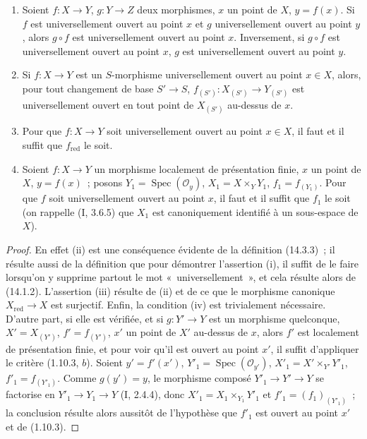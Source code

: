 \begin{proposition}[14.3.4]
\label{IV.14.3.4-fr}
\begin{enumerate}[label=(\roman*)]
  \item Soient $f:X\to Y$, $g:Y\to Z$ deux morphismes, $x$ un point de $X$,
  $y=f(x)$. Si $f$ est universellement ouvert au point $x$ et $g$ universellement
  ouvert au point $y$, alors $g\circ f$ est universellement ouvert au point $x$.
  Inversement, si $g\circ f$ est universellement ouvert au point $x$, $g$ est
  universellement ouvert au point $y$.

  \item Si $f:X\to Y$ est un $S$-morphisme universellement ouvert au point
  $x\in X$, alors, pour tout changement de base $S'\to S$,
  $f_{(S')}:X_{(S')}\to Y_{(S')}$ est universellement ouvert en tout point de
  $X_{(S')}$ au-dessus de $x$.

  \item Pour que $f:X\to Y$ soit universellement ouvert au point $x\in X$, il
  faut et il suffit que $f_{\mathrm{red}}$ le soit.

  \item Soient $f:X\to Y$ un morphisme localement de présentation finie, $x$ un
  point de $X$, $y=f(x)$~; posons $Y_1=\operatorname{Spec}(\mathcal O_y)$,
  $X_1=X\times_Y Y_1$, $f_1=f_{(Y_1)}$. Pour que $f$ soit universellement ouvert
  au point $x$, il faut et il suffit que $f_1$ le soit (on rappelle (I, 3.6.5) que
  $X_1$ est canoniquement identifié à un sous-espace de $X$).
\end{enumerate}
\end{proposition}

\begin{proof}
En effet (ii) est une conséquence évidente de la définition (14.3.3)~; il résulte
aussi de la définition que pour démontrer l'assertion (i), il suffit de le faire
lorsqu'on y supprime partout le mot «~universellement~», et cela résulte alors de
(14.1.2). L'assertion (iii) résulte de (ii) et de ce que le morphisme canonique
$X_{\mathrm{red}}\to X$ est surjectif. Enfin, la condition (iv) est trivialement
nécessaire. D'autre part, si elle est vérifiée, et si $g:Y'\to Y$ est un morphisme
quelconque, $X'=X_{(Y')}$, $f'=f_{(Y')}$, $x'$ un point de $X'$ au-dessus de $x$,
alors $f'$ est localement de présentation finie, et pour voir qu'il est ouvert au
point $x'$, il suffit d'appliquer le critère (1.10.3, $b$). Soient
$y'=f'(x')$, $Y'_1=\operatorname{Spec}(\mathcal O_{y'})$,
$X'_1=X'\times_{Y'}Y'_1$, $f'_1=f_{(Y'_1)}$. Comme $g(y')=y$, le morphisme
composé $Y'_1\to Y'\to Y$ se factorise en $Y'_1\to Y_1\to Y$ (I, 2.4.4), donc
$X'_1=X_1\times_{Y_1}Y'_1$ et $f'_1=(f_1)_{(Y'_1)}$~; la conclusion résulte alors
aussitôt de l'hypothèse que $f'_1$ est ouvert au point $x'$ et de (1.10.3).
\end{proof}


